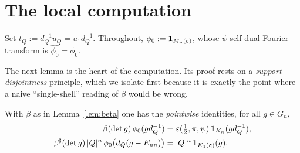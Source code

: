 \section*{The local computation}

Set $t_Q:=d_Q^{-1}u_Q=u_1 d_Q^{-1}$. Throughout, $\phi_0:=\mathbf 1_{M_n(\mathfrak{o})}$,
whose $\psi$-self-dual Fourier transform is $\widehat{\phi_0}=\phi_0$.

The next lemma is the heart of the computation. Its proof rests on a
\emph{support-disjointness} principle, which we isolate first because it is exactly the
point where a naive ``single-shell'' reading of $\beta$ would be wrong.

\begin{qtwolemma}\label{lem:support}
With $\beta$ as in Lemma~\ref{lem:beta} one has the \emph{pointwise} identities, for all
$g\in G_n$,
\begin{align}
\beta(\det g)\,\phi_0(g d_Q^{-1})&=\varepsilon(\tfrac12,\pi,\psi)\,\mathbf 1_{K_n}(g d_Q^{-1}),
\label{eq:supp1}\\
\beta^\sharp(\det g)\,|Q|^{n}\,\phi_0\big(d_Q(g-E_{nn})\big)&=|Q|^{n}\,\mathbf 1_{K_1(\mathfrak{q})}(g).
\label{eq:supp2}
\end{align}
\end{qtwolemma}

